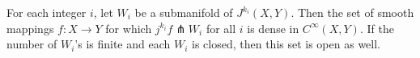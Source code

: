 For each integer $i$, let $W_i$ be a submanifold of $J^{k_i}(X, Y)$. Then the set of smooth mappings $f: X \to Y$ for which $j^{k_i} f \pitchfork W_i$ for all $i$ is dense in $C^\infty(X, Y)$. If the number of $W_i$'s is finite and each $W_i$ is closed, then this set is open as well.